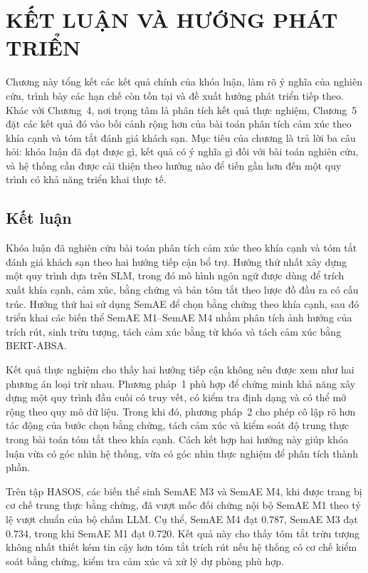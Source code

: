 \chapter{KẾT LUẬN VÀ HƯỚNG PHÁT TRIỂN}
\label{chap:ket-luan-huong-phat-trien}

Chương này tổng kết các kết quả chính của khóa luận, làm rõ ý nghĩa của nghiên cứu, trình bày các hạn chế còn tồn tại và đề xuất hướng phát triển tiếp theo. Khác với Chương~4, nơi trọng tâm là phân tích kết quả thực nghiệm, Chương~5 đặt các kết quả đó vào bối cảnh rộng hơn của bài toán phân tích cảm xúc theo khía cạnh và tóm tắt đánh giá khách sạn. Mục tiêu của chương là trả lời ba câu hỏi: khóa luận đã đạt được gì, kết quả có ý nghĩa gì đối với bài toán nghiên cứu, và hệ thống cần được cải thiện theo hướng nào để tiến gần hơn đến một quy trình có khả năng triển khai thực tế.

\section{Kết luận}
\label{sec:chap5-ket-luan}

Khóa luận đã nghiên cứu bài toán phân tích cảm xúc theo khía cạnh và tóm tắt đánh giá khách sạn theo hai hướng tiếp cận bổ trợ. Hướng thứ nhất xây dựng một quy trình dựa trên SLM, trong đó mô hình ngôn ngữ được dùng để trích xuất khía cạnh, cảm xúc, bằng chứng và bản tóm tắt theo lược đồ đầu ra có cấu trúc. Hướng thứ hai sử dụng SemAE để chọn bằng chứng theo khía cạnh, sau đó triển khai các biến thể SemAE M1--SemAE M4 nhằm phân tích ảnh hưởng của trích rút, sinh trừu tượng, tách cảm xúc bằng từ khóa và tách cảm xúc bằng BERT-ABSA.

Kết quả thực nghiệm cho thấy hai hướng tiếp cận không nên được xem như hai phương án loại trừ nhau. Phương pháp~1 phù hợp để chứng minh khả năng xây dựng một quy trình đầu cuối có truy vết, có kiểm tra định dạng và có thể mở rộng theo quy mô dữ liệu. Trong khi đó, phương pháp~2 cho phép cô lập rõ hơn tác động của bước chọn bằng chứng, tách cảm xúc và kiểm soát độ trung thực trong bài toán tóm tắt theo khía cạnh. Cách kết hợp hai hướng này giúp khóa luận vừa có góc nhìn hệ thống, vừa có góc nhìn thực nghiệm để phân tích thành phần.

Trên tập HASOS, các biến thể sinh SemAE M3 và SemAE M4, khi được trang bị cơ chế trung thực bằng chứng, đã vượt mốc đối chứng nội bộ SemAE M1 theo tỷ lệ vượt chuẩn của bộ chấm LLM. Cụ thể, SemAE M4 đạt \num{0.787}, SemAE M3 đạt \num{0.734}, trong khi SemAE M1 đạt \num{0.720}. Kết quả này cho thấy tóm tắt trừu tượng không nhất thiết kém tin cậy hơn tóm tắt trích rút nếu hệ thống có cơ chế kiểm soát bằng chứng, kiểm tra cảm xúc và xử lý dự phòng phù hợp.

